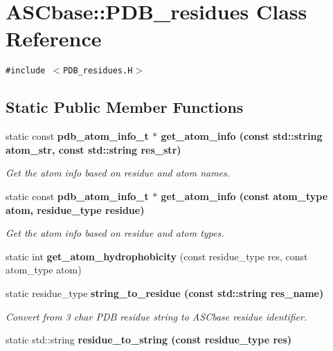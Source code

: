 \section{ASCbase::PDB\_\-residues Class Reference}
\label{classASCbase_1_1PDB__residues}
{\tt \#include $<$PDB\_\-residues.H$>$}

\subsection*{Static Public Member Functions}
\begin{CompactItemize}
\item 
static const \bf{pdb\_\-atom\_\-info\_\-t} $\ast$ \bf{get\_\-atom\_\-info} (const std::string atom\_\-str, const std::string res\_\-str)\label{classASCbase_1_1PDB__residues_de442e4bc404da4062cfcd6e454296e1}

\begin{CompactList}\small\item\em Get the atom info based on residue and atom names. \item\end{CompactList}\item 
static const \bf{pdb\_\-atom\_\-info\_\-t} $\ast$ \bf{get\_\-atom\_\-info} (const atom\_\-type atom, residue\_\-type residue)\label{classASCbase_1_1PDB__residues_af86442358d5e0e48c2597cc70842a50}

\begin{CompactList}\small\item\em Get the atom info based on residue and atom types. \item\end{CompactList}\item 
static int \textbf{get\_\-atom\_\-hydrophobicity} (const residue\_\-type res, const atom\_\-type atom)\label{classASCbase_1_1PDB__residues_4323c94f8f050549e74e8767ae6452eb}

\item 
static residue\_\-type \bf{string\_\-to\_\-residue} (const std::string res\_\-name)\label{classASCbase_1_1PDB__residues_08074264e135aee3ba43dcee9a9da5b0}

\begin{CompactList}\small\item\em Convert from 3 char PDB residue string to ASCbase residue identifier. \item\end{CompactList}\item 
static std::string \bf{residue\_\-to\_\-string} (const residue\_\-type res)\label{classASCbase_1_1PDB__residues_d17b8fa8fe06ed333b7d35510ee05b01}


\end{CompactItemize}
